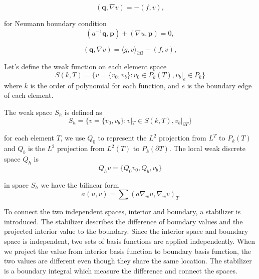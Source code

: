 \begin{equation}
(\mathbf{q}, \nabla v) = -(f, v),
\end{equation}

for Neumann boundary condition
\begin{equation}
(a^{-1} \mathbf{q}, \mathbf{p}) + (\nabla u, \mathbf{p}) = 0,
\end{equation}

\begin{equation}
(\mathbf{q}, \nabla v) = \langle g, v \rangle_{\partial \Omega} - (f, v),
\end{equation}

Let's define the weak function on each element space
\begin{equation}
S(k, T) = \{ v = \{ v_{0}, v_{b} \} : v_{0} \in P_{k} (T), v_{b}|_{e} \in P_{k} \}
\end{equation}
where $ k $ is the order of polynomial for each function, and $ e $ is the boundary edge of each element.

The weak space $ S_{h} $ is defined as
\begin{equation}
S_{h} = \{ v = \{ v_{0}, v_{b} \} : v |_{T} \in S(k, T), v_{b} |_{\partial T} \}
\end{equation}

for each element $ T $, we use $ Q_{0} $ to represent the $ L^{2} $ projection from $ L^{T} $ to $ P_{k}(T) $ and $ Q_{b} $ is the $ L^{2} $ projection from $ L^{2}(T) $ to $ P_{k}(\partial T) $. The local weak discrete space $ Q_{h} $ is
\begin{equation}
Q_{h} v = \{ Q_{0} v_{0}, Q_{b}, v_{b} \}
\end{equation}

in space $ S_{h} $ we have the bilinear form
\begin{equation}
a(u, v) = \sum (a \nabla_{w} u, \nabla_{w} v)_{T}
\end{equation}

To connect the two independent spaces, interior and boundary, a stabilizer is introduced. The stabilizer describes the difference of boundary values and the projected interior value to the boundary. Since the interior space and boundary space is independent, two sets of basis functions are applied independently. When we project the value from interior basis function to boundary basis function, the two values are different even though they share the same location. The stabilizer is a boundary integral which measure the difference and connect the spaces.


